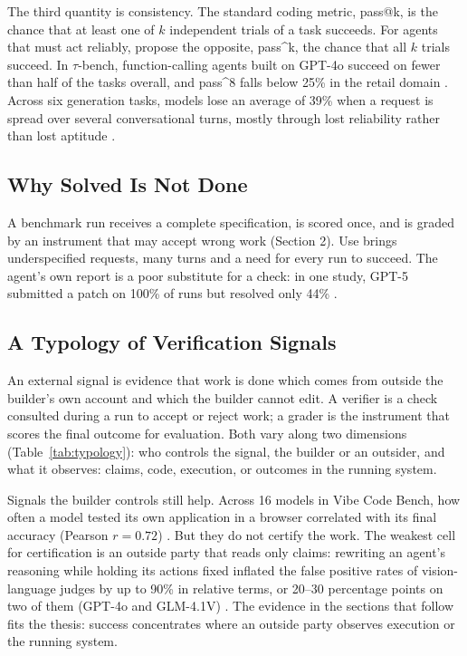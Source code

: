 The third quantity is consistency. The standard coding metric, pass@k, is the chance that at least one of $k$ independent trials of a task succeeds. For agents that must act reliably, \citet{A9} propose the opposite, pass\textasciicircum{}k, the chance that all $k$ trials succeed. In $\tau$-bench, function-calling agents built on GPT-4o succeed on fewer than half of the tasks overall, and pass\textasciicircum{}8 falls below 25\% in the retail domain \citep{A9}. Across six generation tasks, models lose an average of 39\% when a request is spread over several conversational turns, mostly through lost reliability rather than lost aptitude \citep{F16}.

\subsection{Why Solved Is Not Done}

A benchmark run receives a complete specification, is scored once, and is graded by an instrument that may accept wrong work (Section 2). Use brings underspecified requests, many turns and a need for every run to succeed. The agent's own report is a poor substitute for a check: in one study, GPT-5 submitted a patch on 100\% of runs but resolved only 44\% \citep{F20}.

\subsection{A Typology of Verification Signals}

An external signal is evidence that work is done which comes from outside the builder's own account and which the builder cannot edit. A verifier is a check consulted during a run to accept or reject work; a grader is the instrument that scores the final outcome for evaluation. Both vary along two dimensions (Table~\ref{tab:typology}): who controls the signal, the builder or an outsider, and what it observes: claims, code, execution, or outcomes in the running system.

Signals the builder controls still help. Across 16 models in Vibe Code Bench, how often a model tested its own application in a browser correlated with its final accuracy (Pearson $r = 0.72$) \citep{C19}. But they do not certify the work. The weakest cell for certification is an outside party that reads only claims: rewriting an agent's reasoning while holding its actions fixed inflated the false positive rates of vision-language judges by up to 90\% in relative terms, or 20--30 percentage points on two of them (GPT-4o and GLM-4.1V) \citep{V24}. The evidence in the sections that follow fits the thesis: success concentrates where an outside party observes execution or the running system.

